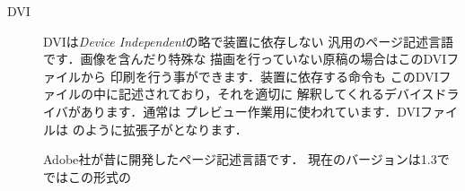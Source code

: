\begin{description}
\item[DVI]
  DVIは\emph{Device Independent}の略で装置に依存しない
  汎用のページ記述言語です．画像を含んだり特殊な
  描画を行っていない原稿の場合はこのDVIファイルから
  印刷を行う事ができます．装置に依存する命令も
  このDVIファイルの中に記述されており，それを適切に
  解釈してくれるデバイスドライバがあります．通常は
  プレビュー作業用に使われています．DVIファイルは
  のように拡張子がとなります．
\item[{\PS}]
  Adobe社が昔に開発したページ記述言語です．
  現在のバージョンは1.3で\unixos ではこの{\PS}形式の

\end{description}
